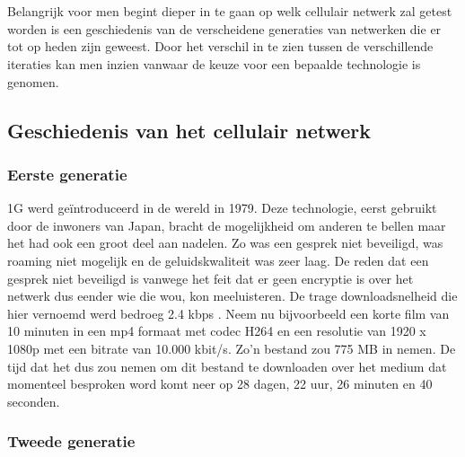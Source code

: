 \chapter{}%
\label{ch:stand-van-zaken}



Belangrijk voor men begint dieper in te gaan op welk cellulair netwerk zal getest worden is een geschiedenis van de verscheidene generaties van netwerken die er tot op heden zijn geweest. Door het verschil in te zien tussen de verschillende iteraties kan men inzien vanwaar de keuze voor een bepaalde technologie is genomen.

\section{Geschiedenis van het cellulair netwerk}

\subsection{Eerste generatie}

1G werd geïntroduceerd in de wereld in 1979. Deze technologie, eerst gebruikt door de inwoners van Japan, bracht de mogelijkheid om anderen te bellen maar het had ook een groot deel aan nadelen. Zo was een gesprek niet beveiligd, was roaming niet mogelijk en de geluidskwaliteit was zeer laag.
De reden dat een gesprek niet beveiligd is vanwege het feit dat er geen encryptie is over het netwerk dus eender wie die wou, kon meeluisteren. De trage downloadsnelheid die hier vernoemd werd bedroeg 2.4 kbps \autocite{Galazzo2020}. Neem nu bijvoorbeeld een korte film van 10 minuten in een mp4 formaat met codec H264 en een resolutie van 1920 x 1080p met een bitrate van 10.000 kbit/s. Zo'n bestand zou 775 MB in nemen. \autocite{Helme2019} De tijd dat het dus zou nemen om dit bestand te downloaden over het medium dat momenteel besproken word komt neer op 28 dagen, 22 uur, 26 minuten en 40 seconden. \autocite{Wooding2024}

\subsection{Tweede generatie}

